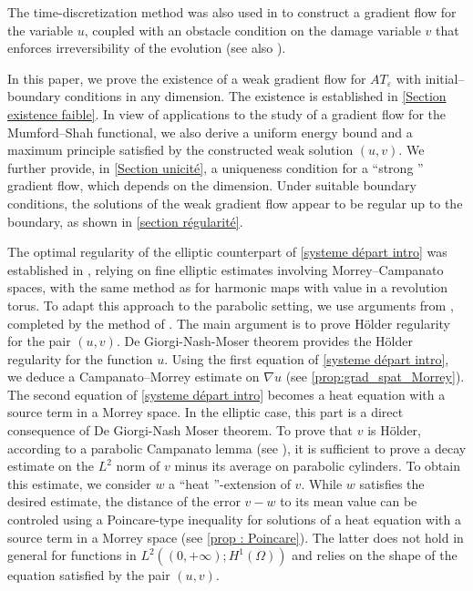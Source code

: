 \documentclass[reqno,12pt,twoside]{amsart}
\numberwithin{equation}{section} \numberwithin{theorem}{section}
\numberwithin{proposition}{section} \numberwithin{lemma}{section}
\numberwithin{corollary}{section}
\numberwithin{definition}{section} \numberwithin{remark}{section}
\begin{document}
\smallskip

The time-discretization method was also used in \cite{BM14} to construct a gradient flow for the variable $u$, coupled with an obstacle condition on the damage variable $v$ that enforces irreversibility of the evolution (see also \cite{G05}). 

\smallskip

In this paper, we prove the existence of a weak gradient flow for $AT_\varepsilon$ with initial--boundary conditions in any dimension. The existence is established in \autoref{Section existence faible}. In view of applications to the study of a gradient flow for the Mumford--Shah functional, we also derive a uniform energy bound and a maximum principle satisfied by the constructed weak solution $(u,v)$. We further provide, in \autoref{Section unicité}, a uniqueness condition for a ``strong '' gradient flow, which depends on the dimension. Under suitable boundary conditions, the solutions of the weak gradient flow appear to be regular up to the boundary, as shown in \autoref{section régularité}.

\smallskip

The optimal regularity of the elliptic counterpart of \eqref{systeme départ intro} was established in \cite{BMRa23}, relying on fine elliptic estimates involving Morrey--Campanato spaces, with the same method as \cite{R93} for harmonic maps with value in a revolution torus. To adapt this approach to the parabolic setting, we use arguments from \cite{L96}, completed by the method of \cite{Yin_1997}. The main argument is to prove Hölder regularity for the pair $(u,v)$. De Giorgi-Nash-Moser theorem provides the Hölder regularity for the function $u$. Using the first equation of \eqref{systeme départ intro}, we deduce a Campanato--Morrey estimate on $\nabla u$ (see \autoref{prop:grad_spat_Morrey}). The second equation of \eqref{systeme départ intro} becomes a heat equation with a source term in a Morrey space. In the elliptic case, this part is a direct consequence of De Giorgi-Nash Moser theorem. To prove that $v$ is Hölder, according to a parabolic Campanato lemma (see \cite[Lemma 4.3]{L96}), it is sufficient to prove a decay estimate on the $L^2$ norm of $v$ minus its average on parabolic cylinders. To obtain this estimate, we consider $w$ a ``heat ''-extension of $v$. While $w$ satisfies the desired estimate, the distance of the error $v-w$ to its mean value can be controled using a Poincare-type inequality for solutions of a heat equation with a source term in a Morrey space (see \autoref{prop : Poincare}). 
The latter does not hold in general for functions in $L^2((0,+\infty); H^1(\Omega))$ and relies on the shape of the equation satisfied by the pair $(u,v)$.
\end{document}
